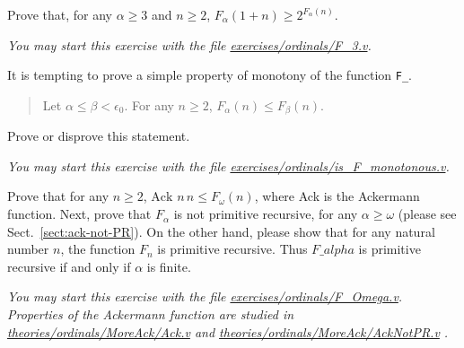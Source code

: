 
\begin{exercise}
Prove that, for any $\alpha\geq 3$ and $n\geq 2$,
$F_\alpha(1+n)\geq 2^{F_\alpha(n)}$.



\emph{You may start this exercise with the file
    \href{https://github.com/coq-community/hydra-battles/tree/master/exercises/ordinals/F_3.v}{exercises/ordinals/F\_3.v}.}
\end{exercise}



\begin{exercise}
It is tempting to prove a simple property of monotony 
of the function \texttt{F\_}.

\begin{quote}
   Let $\alpha\leq\beta<\epsilon_0$. For any $n\geq 2$,
$F_\alpha(n)\leq F_\beta(n)$. 
\end{quote}
Prove or disprove this statement.

\emph{You may start this exercise with the file
    \href{https://github.com/coq-community/hydra-battles/tree/master/exercises/ordinals/is_F_monotonous.v}{exercises/ordinals/is\_F\_monotonous.v}.}
\end{exercise}

\begin{exercise}



Prove that for any $n\geq 2$, $\textrm{Ack}\,\,n\,n\leq  F_\omega(n)$, where \textrm{Ack} is the Ackermann function. Next, prove that $F_\alpha$ is not primitive recursive, for any $\alpha\geq\omega$  (please see Sect.~\vref{sect:ack-not-PR}).
On the other hand, please show that for any natural number $n$, the function $F_n$ is primitive recursive.
Thus $F\_alpha$ is primitive recursive if and only if $\alpha$ is finite.

\emph{You may start this exercise with the file
    \href{https://github.com/coq-community/hydra-battles/tree/master/exercises/ordinals/F_omega.v}{exercises/ordinals/F\_Omega.v}.
Properties of the Ackermann function are studied in
    \href{https://github.com/coq-community/hydra-battles/tree/master/theories/ordinals/MoreAck/Ack.v}{theories/ordinals/MoreAck/Ack.v} and
    \href{https://github.com/coq-community/hydra-battles/tree/master/theories/ordinals/MoreAck/AckNotPR.v}{theories/ordinals/MoreAck/AckNotPR.v}
.}
\end{exercise} 


